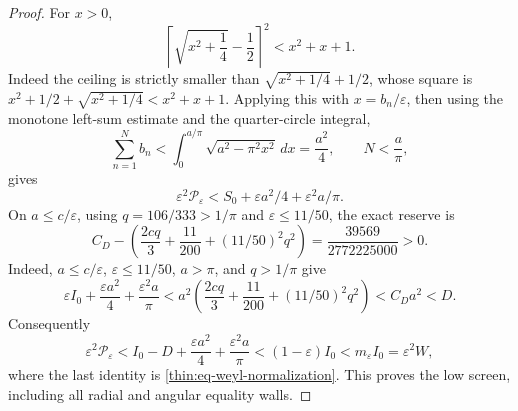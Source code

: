 \documentclass[11pt]{article}
\numberwithin{equation}{section}
\theoremstyle{definition}
\theoremstyle{remark}
\begin{document}
\begin{proof}
For \(x>0\),
\[
\left\lceil\sqrt{x^2+\frac14}-\frac12\right\rceil^2
 <x^2+x+1.
\]
Indeed the ceiling is strictly smaller than
\(\sqrt{x^2+1/4}+1/2\), whose square is
\(x^2+1/2+\sqrt{x^2+1/4}<x^2+x+1\).  Applying this with
\(x=b_n/\varepsilon\), then using the monotone left-sum estimate and the
quarter-circle integral,
\[
 \sum_{n=1}^N b_n
 <\int_0^{a/\pi}\sqrt{a^2-\pi^2x^2}\,dx=\frac{a^2}{4},
 \qquad N<\frac a\pi,
\]
gives
\[
 \varepsilon^2\mathcal P_\varepsilon
 <S_0+\varepsilon a^2/4+\varepsilon^2a/\pi.
\]
On \(a\leq c/\varepsilon\), using \(q=106/333>1/\pi\) and
\(\varepsilon\leq11/50\), the exact reserve is
\begin{equation}
 C_D-\left(\frac{2cq}{3}+\frac{11}{200}
 +(11/50)^2q^2\right)
 =\frac{39569}{2772225000}>0.
 \label{cm:eq-optical-low-reserve}
\end{equation}
Indeed, \(a\leq c/\varepsilon\), \(\varepsilon\leq11/50\),
\(a>\pi\), and \(q>1/\pi\) give
\[
 \varepsilon I_0+\frac{\varepsilon a^2}{4}
 +\frac{\varepsilon^2a}{\pi}
 <a^2\left(\frac{2cq}{3}+\frac{11}{200}
 +(11/50)^2q^2\right)<C_Da^2<D.
\]
Consequently
\[
 \varepsilon^2\mathcal P_\varepsilon
 <I_0-D+\frac{\varepsilon a^2}{4}
 +\frac{\varepsilon^2a}{\pi}
 <(1-\varepsilon)I_0<m_\varepsilon I_0
 =\varepsilon^2W,
\]
where the last identity is \eqref{thin:eq-weyl-normalization}.
This proves the low screen, including all radial and angular equality walls.


\end{proof}
\end{document}
